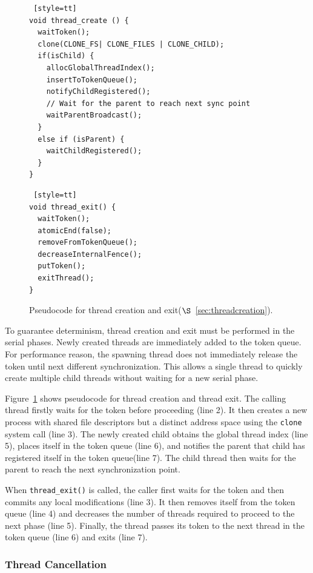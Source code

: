 \begin{figure}
\begin{lstlisting} [style=tt]
void thread_create () {
  waitToken();
  clone(CLONE_FS| CLONE_FILES | CLONE_CHILD);
  if(isChild) {
    allocGlobalThreadIndex();
    insertToTokenQueue();
	notifyChildRegistered();
	// Wait for the parent to reach next sync point
    waitParentBroadcast();	
  }
  else if (isParent) {
    waitChildRegistered();
  }
}
\end{lstlisting}
\begin{lstlisting} [style=tt]
void thread_exit() {
  waitToken();
  atomicEnd(false);
  removeFromTokenQueue();
  decreaseInternalFence();
  putToken();
  exitThread(); 
}
\end{lstlisting}
\caption{Pseudocode for thread creation and exit($\S$~\ref{sec:threadcreation}).
\label{fig:threadcreation}
}
\end{figure}

To guarantee determinism, thread creation and exit must be performed in the serial phases.  Newly created threads are immediately added to the token queue.  For performance reason, the spawning thread does not immediately release the token until next different synchronization. This allows a single thread to quickly create multiple child threads without waiting for a new serial phase.

Figure~\ref{fig:threadcreation} shows pseudocode for thread creation and thread exit. The calling thread firstly waits for the token before proceeding (line 2).  It then creates a new process with shared file descriptors but a distinct address space using the \texttt{clone} system call (line 3).  The newly created child obtains the global thread index (line 5), places itself in the token queue (line 6), and notifies the parent that child has registered itself in the token queue(line 7). The child thread then waits for the parent to reach the next synchronization point. 

When \texttt{thread\_exit()} is called, the caller first waits for the token and then commits any local modifications (line 3). It then removes itself from the token queue (line 4) and decreases the number of threads required to proceed to the next phase (line 5). Finally, the thread passes its token to the next thread in the token queue (line 6) and exits (line 7).

\subsubsection{Thread Cancellation}

